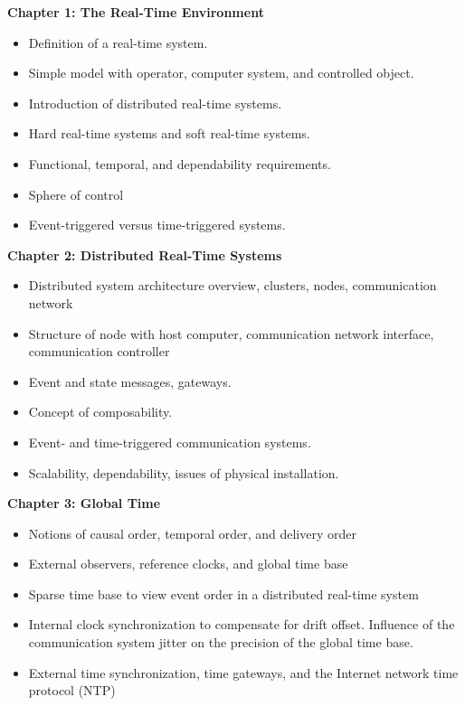 \textbf{Chapter 1: The Real-Time Environment}
\begin{frame}
\begin{itemize}
\item  
  Definition of a real-time system.
\item  
  Simple model with operator, computer system, and controlled object.
\item  
  Introduction of distributed real-time systems.
\item  
  Hard real-time systems and soft real-time systems.
\item  
  Functional, temporal, and dependability requirements.
\item  
  Sphere of control
\item  
  Event-triggered versus time-triggered systems.
\end{itemize}
\end{frame}
\textbf{Chapter 2: Distributed Real-Time Systems}

\begin{itemize}
\item
  Distributed system architecture overview, clusters, nodes,
  communication network
\item
  Structure of node with host computer, communication network interface,
  communication controller
\item
  Event and state messages, gateways.
\item
  Concept of composability.
\item
  Event- and time-triggered communication systems.
\item
  Scalability, dependability, issues of physical installation.
\end{itemize}


\textbf{Chapter 3: Global Time}

\begin{itemize}
\item
  Notions of causal order, temporal order, and delivery order
\item
  External observers, reference clocks, and global time base
\item
  Sparse time base to view event order in a distributed real-time system
\item
  Internal clock synchronization to compensate for drift offset.
  Influence of the communication system jitter on the precision of the
  global time base.
\item
  External time synchronization, time gateways, and the Internet network
  time protocol (NTP)
\end{itemize}

